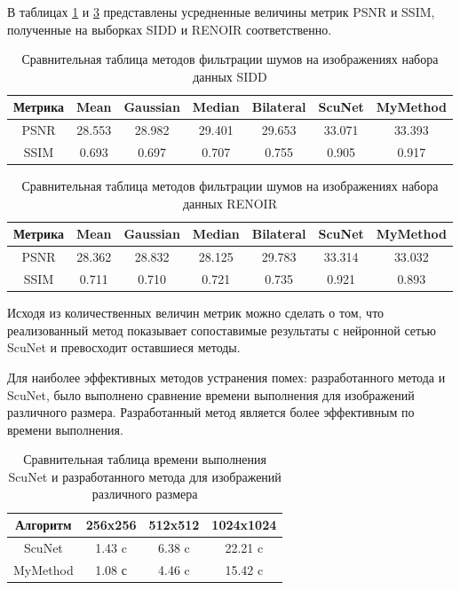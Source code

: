 В таблицах \ref{tabular:sidd_results} и \ref{tabular:renoir_results} представлены усредненные величины метрик PSNR и SSIM, полученные на выборках SIDD и RENOIR соответственно.

\begin{table}[h!]
	\centering
    \captionsetup{justification=raggedleft,singlelinecheck=false}
	\caption{\label{tabular:sidd_results} Сравнительная таблица методов фильтрации шумов на изображениях набора данных SIDD}
	\begin{tabular}{|c|c|c|c|c|c|c|}
    \hline
    \textbf{Метрика} & \textbf{Mean} & \textbf{Gaussian} & \textbf{Median} & \textbf{Bilateral} & \textbf{ScuNet} & \textbf{MyMethod} \\ \hline
    PSNR & 28.553 & 28.982 & 29.401 & 29.653 & 33.071 & 33.393 \\ \hline
    SSIM & 0.693 & 0.697 & 0.707 & 0.755 & 0.905 & 0.917 \\ \hline
    \end{tabular}
\end{table}

\begin{table}[h!]
	\centering
    \captionsetup{justification=raggedleft,singlelinecheck=false}
	\caption{\label{tabular:renoir_results} Сравнительная таблица методов фильтрации шумов на изображениях набора данных RENOIR}
	\begin{tabular}{|c|c|c|c|c|c|c|}
    \hline
    \textbf{Метрика} & \textbf{Mean} & \textbf{Gaussian} & \textbf{Median} & \textbf{Bilateral} & \textbf{ScuNet} & \textbf{MyMethod} \\ \hline
    PSNR & 28.362 & 28.832 & 28.125 & 29.783 & 33.314 & 33.032 \\ \hline
    SSIM & 0.711 & 0.710 & 0.721 & 0.735 & 0.921 & 0.893 \\ \hline
    \end{tabular}
\end{table}

Исходя из количественных величин метрик можно сделать о том, что реализованный метод показывает сопоставимые результаты с нейронной сетью ScuNet и превосходит оставшиеся методы.

Для наиболее эффективных методов устранения помех: разработанного метода и ScuNet, было выполнено сравнение времени выполнения для изображений различного размера. Разработанный метод является более эффективным по времени выполнения.

\begin{table}[h!]
	\centering
    \captionsetup{justification=raggedleft,singlelinecheck=false}
	\caption{\label{tabular:renoir_results} Сравнительная таблица времени выполнения ScuNet и разработанного метода для изображений различного размера}
    \begin{tabular}{|c|c|c|c|}
    \hline
    Алгоритм & 256x256 & 512x512 & 1024x1024 \\ \hline
    ScuNet & 1.43 c & 6.38 c & 22.21 c \\ \hline
    MyMethod & 1.08 с & 4.46 c & 15.42 c \\ \hline
    \end{tabular}
\end{table}


